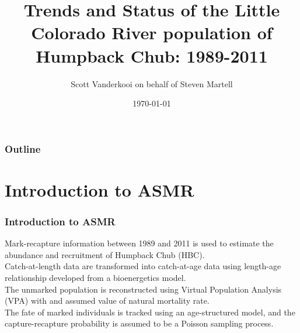 \documentclass{beamer}
\title[HBC Status]{Trends and Status of the Little Colorado River population of Humpback Chub: 1989-2011}
\author{Scott Vanderkooi on behalf of Steven Martell}
\institute[UBC]
{
University of British Columbia \\
\medskip
{\emph{s.martell@mail.ubc.ca}}
}
\date{\today}
\begin{document}
%
\begin{frame}
\titlepage
\end{frame}
%
\begin{frame}[t]\frametitle{Outline}
	\tableofcontents
\end{frame}
%
\section[Introduction]{Introduction to ASMR} %
\label{sec:introduction}
\begin{frame}[t]\frametitle{Introduction to ASMR}
	Mark-recapture information between 1989 and 2011 is used to estimate the abundance and recruitment of Humpback Chub (HBC).\\
	\medskip
	Catch-at-length data are transformed into catch-at-age data using length-age relationship developed from a bioenergetics model.\\
	\medskip
	The unmarked population is reconstructed using Virtual Population Analysis (VPA) with and assumed value of natural mortality rate.\\
	\medskip
	The fate of marked individuals is tracked using an age-structured model, and the capture-recapture probability is assumed to be a Poisson sampling process.\\
\end{frame}
%
\end{document}

